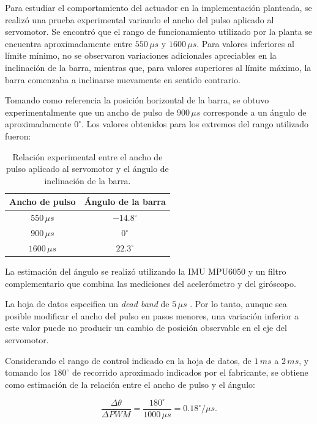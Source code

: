 \documentclass[a4paper, twoside, 10pt, spanish]{article}
\numberwithin{table}{section}
\begin{document}
Para estudiar el comportamiento del actuador en la implementación planteada,
se realizó una prueba experimental variando el ancho del pulso aplicado al
servomotor. Se encontró que el rango de funcionamiento utilizado por la
planta se encuentra aproximadamente entre $550\,\mu s$ y $1600\,\mu s$.
Para valores inferiores al límite mínimo, no se observaron variaciones adicionales apreciables en la inclinación de la barra, mientras que, para valores superiores al límite máximo, la barra comenzaba a inclinarse nuevamente en sentido contrario.

Tomando como referencia la posición horizontal de la barra, se obtuvo
experimentalmente que un ancho de pulso de $900\,\mu s$ corresponde a un
ángulo de aproximadamente $0^\circ$. Los valores obtenidos para los
extremos del rango utilizado fueron:

\begin{table}[H]
    \centering
    \begin{tabular}{cc}
        \toprule
        Ancho de pulso & Ángulo de la barra \\
        \midrule
        $550\,\mu s$ & $-14.8^\circ$ \\
        $900\,\mu s$ & $0^\circ$ \\
        $1600\,\mu s$ & $22.3^\circ$ \\
        \bottomrule
    \end{tabular}
    \caption{Relación experimental entre el ancho de pulso aplicado al
    servomotor y el ángulo de inclinación de la barra.}
    \label{tab:servo_pwm_angulo}
\end{table}

La estimación del ángulo se realizó utilizando la IMU MPU6050 y un filtro
complementario que combina las mediciones del acelerómetro y del
giróscopo.


La hoja de datos especifica un \textit{dead band} de $5\,\mu s$
\cite{mg996r}. Por lo tanto, aunque sea posible modificar el ancho del
pulso en pasos menores, una variación inferior a este valor puede no
producir un cambio de posición observable en el eje del servomotor.

Considerando el rango de control indicado en la hoja de datos, de
$1\,ms$ a $2\,ms$, y tomando los $180^\circ$ de recorrido aproximado
indicados por el fabricante, se obtiene como estimación de la relación
entre el ancho de pulso y el ángulo:

\begin{equation*}
\frac{\Delta\theta}{\Delta PWM}
=
\frac{180^\circ}{1000\,\mu s}
=
0.18^\circ/\mu s.
\end{equation*}
\end{document}
